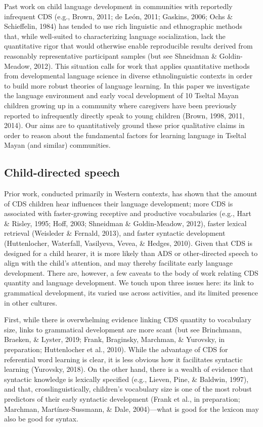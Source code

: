 \documentclass[floatsintext,man]{apa6}
\theoremstyle{definition}
\theoremstyle{definition}
\theoremstyle{definition}
\theoremstyle{remark}
\begin{document}
Past work on child language development in communities with reportedly
infrequent CDS (e.g., Brown, 2011; de León, 2011; Gaskins, 2006; Ochs \&
Schieffelin, 1984) has tended to use rich linguistic and ethnographic
methods that, while well-suited to characterizing language
socialization, lack the quantitative rigor that would otherwise enable
reproducible results derived from reasonably representative participant
samples (but see Shneidman \& Goldin-Meadow, 2012). This situation calls
for work that applies quantitative methods from developmental language
science in diverse ethnolinguistic contexts in order to build more
robust theories of language learning. In this paper we investigate the
language environment and early vocal development of 10 Tseltal Mayan
children growing up in a community where caregivers have been previously
reported to infrequently directly speak to young children (Brown, 1998,
2011, 2014). Our aims are to quantitatively ground these prior
qualitative claims in order to reason about the fundamental factors for
learning language in Tseltal Mayan (and similar) communities.

\subsection{Child-directed speech}\label{intro-cds}

Prior work, conducted primarily in Western contexts, has shown that the
amount of CDS children hear influences their language development; more
CDS is associated with faster-growing receptive and productive
vocabularies (e.g., Hart \& Risley, 1995; Hoff, 2003; Shneidman \&
Goldin-Meadow, 2012), faster lexical retrieval (Weisleder \& Fernald,
2013), and faster syntactic development (Huttenlocher, Waterfall,
Vasilyeva, Vevea, \& Hedges, 2010). Given that CDS is designed for a
child hearer, it is more likely than ADS or other-directed speech to
align with the child's attention, and may thereby facilitate early
language development. There are, however, a few caveats to the body of
work relating CDS quantity and language development. We touch upon three
issues here: its link to grammatical development, its varied use across
activities, and its limited presence in other cultures.

First, while there is overwhelming evidence linking CDS quantity to
vocabulary size, links to grammatical development are more scant (but
see Brinchmann, Braeken, \& Lyster, 2019; Frank, Braginsky, Marchman, \&
Yurovsky, in preparation; Huttenlocher et al., 2010). While the
advantage of CDS for referential word learning is clear, it is less
obvious how it facilitates syntactic learning (Yurovsky, 2018). On the
other hand, there is a wealth of evidence that syntactic knowledge is
lexically specified (e.g., Lieven, Pine, \& Baldwin, 1997), and that,
crosslinguistically, children's vocabulary size is one of the most
robust predictors of their early syntactic development (Frank et al., in
preparation; Marchman, Martínez-Sussmann, \& Dale, 2004)---what is good
for the lexicon may also be good for syntax.
\end{document}
